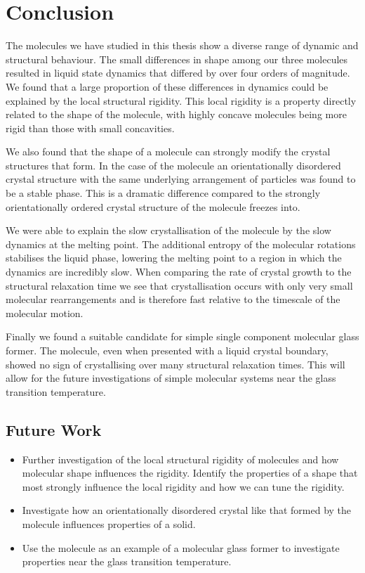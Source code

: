 \chapter{Conclusion}

The molecules we have studied in this thesis show a diverse range of dynamic and structural behaviour. The small differences in shape among our three molecules resulted in liquid state dynamics that differed by over four orders of magnitude. We found that a large proportion of these differences in dynamics could be explained by the local structural rigidity. This local rigidity is a property directly related to the shape of the molecule, with highly concave molecules being more rigid than those with small concavities.

We also found that the shape of a molecule can strongly modify the crystal structures that form. In the case of the \dcon molecule an orientationally disordered crystal structure with the same underlying arrangement of particles was found to be a stable phase. This is a dramatic difference compared to the strongly orientationally ordered crystal structure of the \done molecule freezes into.

We were able to explain the slow crystallisation of the \done molecule by the slow dynamics at the melting point. The additional entropy of the molecular rotations stabilises the liquid phase, lowering the melting point to a region in which the dynamics are incredibly slow. When comparing the rate of crystal growth to the structural relaxation time we see that crystallisation occurs with only very small molecular rearrangements and is therefore fast relative to the timescale of the molecular motion.

Finally we found a suitable candidate for simple single component molecular glass former. The \tri molecule, even when presented with a liquid crystal boundary, showed no sign of crystallising over many structural relaxation times. This will allow for the future investigations of simple molecular systems near the glass transition temperature.


\section{Future Work}

\begin{itemize}
    \item Further investigation of the local structural rigidity of molecules and how molecular shape influences the rigidity. Identify the properties of a shape that most strongly influence the local rigidity and how we can tune the rigidity.
    \item Investigate how an orientationally disordered crystal like that formed by the \dcon molecule influences properties of a solid.
    \item Use the \tri molecule as an example of a molecular glass former to investigate properties near the glass transition temperature.
\end{itemize}
